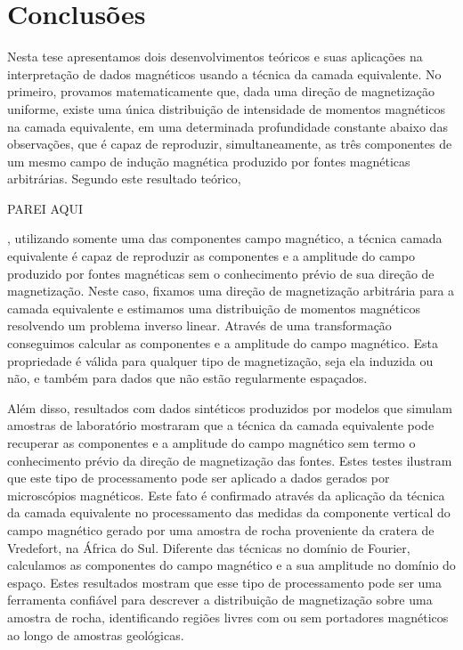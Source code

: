 \chapter{Conclusões}
\label{chap:conclusion}

Nesta tese apresentamos dois desenvolvimentos teóricos e suas aplicações na interpretação de dados magnéticos 
usando a técnica da camada equivalente. 
No primeiro, provamos matematicamente que, dada uma direção de magnetização uniforme, existe uma única distribuição 
de intensidade de momentos magnéticos na camada equivalente, em uma determinada profundidade constante abaixo das observações, 
que é capaz de reproduzir, simultaneamente, as três componentes de um mesmo campo de indução magnética produzido 
por fontes magnéticas arbitrárias. Segundo este resultado teórico, 

PAREI AQUI

, utilizando somente uma das componentes campo magnético, a técnica camada equivalente é capaz de reproduzir as componentes e a amplitude do campo produzido por fontes magnéticas sem o conhecimento prévio de sua direção de magnetização. Neste caso, fixamos uma direção de magnetização arbitrária para a camada equivalente e estimamos uma distribuição de momentos magnéticos resolvendo um problema inverso linear. Através de uma transformação conseguimos calcular as componentes e a amplitude do campo magnético. Esta propriedade é válida para qualquer tipo de magnetização, seja ela induzida ou não, e também para dados que não estão regularmente espaçados. 

Além disso, resultados com dados sintéticos produzidos por modelos que simulam amostras de laboratório mostraram que a técnica da camada equivalente pode recuperar as componentes e a amplitude do campo magnético sem termo o conhecimento prévio da direção de magnetização das fontes. Estes testes ilustram que este tipo de processamento pode ser aplicado a dados gerados por microscópios magnéticos. Este fato é confirmado através da aplicação da técnica da camada equivalente no processamento das medidas da componente vertical do campo magnético gerado por uma amostra de rocha proveniente da cratera de Vredefort, na África do Sul. Diferente das técnicas no domínio de Fourier, calculamos as componentes do campo magnético e a sua amplitude no domínio do espaço. Estes resultados mostram que esse tipo de processamento pode ser uma ferramenta confiável para descrever a distribuição de magnetização sobre uma amostra de rocha, identificando regiões livres com ou sem portadores magnéticos ao longo de amostras geológicas.

